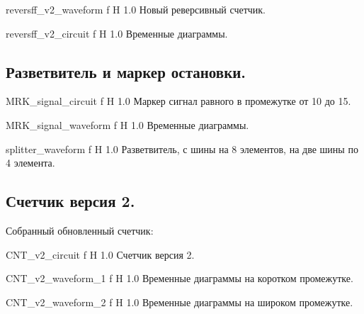 \documentclass{bmstu}
\begin{document}
	{reversff_v2_waveform}
	{f} %
	{H} %
	{1.0\textwidth} %
	{Новый реверсивный счетчик.} %
	
	{reversff_v2_circuit}
	{f} %
	{H} %
	{1.0\textwidth} %
	{Временные диаграммы.} %
	
	\subsection{Разветвитель и маркер остановки.}
	
	{MRK_signal_circuit}
	{f} %
	{H} %
	{1.0\textwidth} %
	{Маркер сигнал равного в промежутке от 10 до 15.} %
	
	{MRK_signal_waveform}
	{f} %
	{H} %
	{1.0\textwidth} %
	{Временные диаграммы.} %
	
	{splitter_waveform}
	{f} %
	{H} %
	{1.0\textwidth} %
	{Разветвитель, с шины на 8 элементов, на две шины по 4 элемента.} %
	
	\subsection{Счетчик версия 2.}
	
	\begin{flushleft}
		Собранный обновленный счетчик:
	\end{flushleft}

	{CNT_v2_circuit}
	{f} %
	{H} %
	{1.0\textwidth} %
	{Счетчик версия 2.} %
	
	{CNT_v2_waveform_1}
	{f} %
	{H} %
	{1.0\textwidth} %
	{Временные диаграммы на коротком промежутке.} %
	
	{CNT_v2_waveform_2}
	{f} %
	{H} %
	{1.0\textwidth} %
	{Временные диаграммы на широком промежутке.} %
\end{document}
